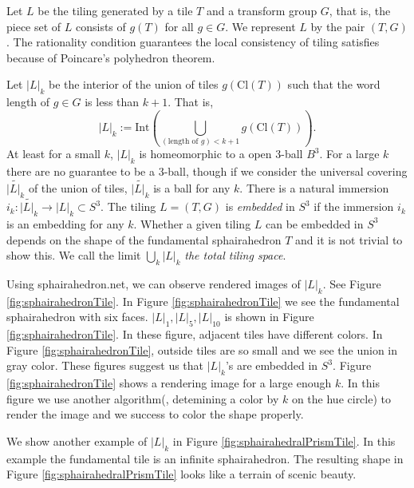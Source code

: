 \documentclass[suppldata, dvipdfmx]{interact}
\theoremstyle{plain}%
\theoremstyle{definition}
\theoremstyle{remark}
\theoremstyle{problemstyle}
\begin{document}
Let $L$ be the tiling generated by a tile $T$ and a transform group $G$, that is, the piece set of $L$ consists of $g(T)$ for all $g\in G$.  We represent $L$ by the pair $(T,G)$.  The rationality condition guarantees the local consistency of tiling satisfies because of Poincare's polyhedron theorem.  

Let $|L|_k$ be the interior of the union of tiles $g(\text{Cl}(T))$ such that the word length of $g\in G$ is less than $k+1$.  That is,
\[
|L|_k := \text{Int}\left( \bigcup _{(\text{length of }g)<k+1} g(\text{Cl}(T)) \right).
\]
At least for a small $k$, $|L|_k$ is homeomorphic to a open 3-ball $B^3$.  For a large $k$ there are no guarantee to be a 3-ball, though if we consider the universal covering $\widetilde{|L|_k}$ of the union of tiles, $\widetilde{|L|_k}$ is a ball for any $k$.  There is a natural immersion $i_k:\widetilde{|L|_k}\to|L|_k\subset S^3$.  The tiling $L=(T,G)$ is {\it embedded} in $S^3$ if the immersion $i_k$ is an embedding for any $k$.  Whether a given tiling $L$ can be embedded in $S^3$ depends on the shape of the fundamental sphairahedron $T$ and it is not trivial to show this.  We call the limit $\displaystyle\bigcup_k|L|_k$ {\it the total tiling space}.

Using sphairahedron.net\cite{sphairahedron_net}, we can observe rendered images of $|L|_k$.  See Figure \ref{fig:sphairahedronTile}.   In Figure
\ref{fig:sphairahedronTile} we see the fundamental sphairahedron with six faces.  $|L|_1, |L|_5, |L|_{10}$ is shown in Figure
\ref{fig:sphairahedronTile}.  In these figure, adjacent tiles have different colors.  In Figure \ref{fig:sphairahedronTile}, outside tiles are so small and we see the union in gray color.  These figures suggest us that $|L|_k$'s are embedded in $S^3$.  Figure \ref{fig:sphairahedronTile} shows a rendering image for a large enough $k$.  In this figure we use another algorithm(, detemining a color by $k$ on the hue circle) to render the image and we success to color the shape properly. 

We show another example of $|L|_k$ in Figure \ref{fig:sphairahedralPrismTile}.  In this example the fundamental tile is an infinite sphairahedron.  The resulting shape in Figure \ref{fig:sphairahedralPrismTile} looks like a terrain of scenic beauty.
\end{document}
